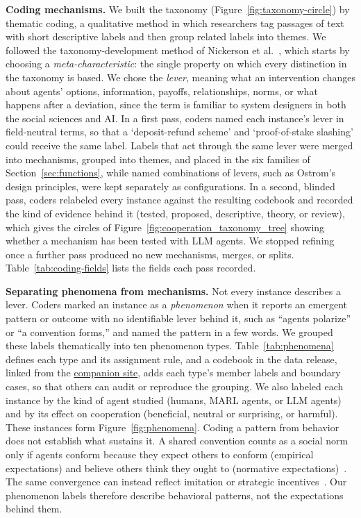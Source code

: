 \documentclass[runningheads]{llncs}
\begin{document}
\textbf{Coding mechanisms.} We built the taxonomy (Figure~\mbox{\ref{fig:taxonomy-circle}}) by thematic coding, a qualitative method in which researchers tag passages of text with short descriptive labels and then group related labels into themes. We followed the taxonomy-development method of Nickerson et al.~\mbox{\citep{nickerson2013taxonomy}}, which starts by choosing a \emph{meta-characteristic}: the single property on which every distinction in the taxonomy is based. We chose the \emph{lever}, meaning what an intervention changes about agents' options, information, payoffs, relationships, norms, or what happens after a deviation, since the term is familiar to system designers in both the social sciences and AI. In a first pass, coders named each instance's lever in field-neutral terms, so that a `deposit-refund scheme' and `proof-of-stake slashing' could receive the same label. Labels that act through the same lever were merged into mechanisms, grouped into themes, and placed in the six families of Section~\mbox{\ref{sec:functions}}, while named combinations of levers, such as Ostrom's design principles, were kept separately as configurations. In a second, blinded pass, coders relabeled every instance against the resulting codebook and recorded the kind of evidence behind it (tested, proposed, descriptive, theory, or review), which gives the circles of Figure~\mbox{\ref{fig:cooperation_taxonomy_tree}} showing whether a mechanism has been tested with LLM agents. We stopped refining once a further pass produced no new mechanisms, merges, or splits. Table~\mbox{\ref{tab:coding-fields}} lists the fields each pass recorded.

\textbf{Separating phenomena from mechanisms.} Not every instance describes a lever. Coders marked an instance as a \emph{phenomenon} when it reports an emergent pattern or outcome with no identifiable lever behind it, such as ``agents polarize'' or ``a convention forms,'' and named the pattern in a few words. We grouped these labels thematically into ten phenomenon types. Table~\mbox{\ref{tab:phenomena}} defines each type and its assignment rule, and a codebook in the data release, linked from the \href{https://van-truong.github.io/institutional-design-for-ai-agents/}{companion site}, adds each type's member labels and boundary cases, so that others can audit or reproduce the grouping. We also labeled each instance by the kind of agent studied (humans, MARL agents, or LLM agents) and by its effect on cooperation (beneficial, neutral or surprising, or harmful). These instances form Figure~\mbox{\ref{fig:phenomena}}. Coding a pattern from behavior does not establish what sustains it. A shared convention counts as a social norm only if agents conform because they expect others to conform (empirical expectations) and believe others think they ought to (normative expectations)~\mbox{\citep{bicchieri2006grammar}}. The same convergence can instead reflect imitation or strategic incentives~\mbox{\citep{cialdini1990focus,crawford1995grammar,muralidharan2026norms}}. Our phenomenon labels therefore describe behavioral patterns, not the expectations behind them.
\end{document}
